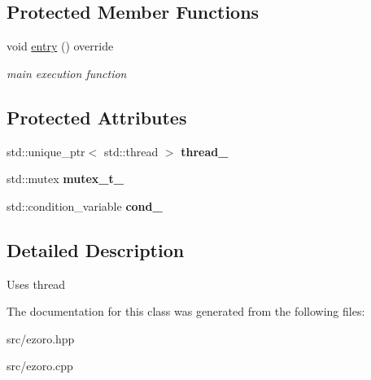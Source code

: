 \subsection*{Protected Member Functions}
\begin{DoxyCompactItemize}
\item 
\hypertarget{classcoco_1_1_parallel_activity_a320a783acbe011c53fed23747336e713}{void \hyperlink{classcoco_1_1_parallel_activity_a320a783acbe011c53fed23747336e713}{entry} () override}\label{classcoco_1_1_parallel_activity_a320a783acbe011c53fed23747336e713}

\begin{DoxyCompactList}\small\item\em main execution function \end{DoxyCompactList}\end{DoxyCompactItemize}
\subsection*{Protected Attributes}
\begin{DoxyCompactItemize}
\item 
\hypertarget{classcoco_1_1_parallel_activity_ae874a1d7b5a96573d823f559fb536952}{std\-::unique\-\_\-ptr$<$ std\-::thread $>$ {\bfseries thread\-\_\-}}\label{classcoco_1_1_parallel_activity_ae874a1d7b5a96573d823f559fb536952}

\item 
\hypertarget{classcoco_1_1_parallel_activity_a287ffe32ef172b36bf2d409aace9d521}{std\-::mutex {\bfseries mutex\-\_\-t\-\_\-}}\label{classcoco_1_1_parallel_activity_a287ffe32ef172b36bf2d409aace9d521}

\item 
\hypertarget{classcoco_1_1_parallel_activity_a1dcd65a0e7e115c3deebdebd2e8646a1}{std\-::condition\-\_\-variable {\bfseries cond\-\_\-}}\label{classcoco_1_1_parallel_activity_a1dcd65a0e7e115c3deebdebd2e8646a1}

\end{DoxyCompactItemize}


\subsection{Detailed Description}
Uses thread 

The documentation for this class was generated from the following files\-:\begin{DoxyCompactItemize}
\item 
src/ezoro.\-hpp\item 
src/ezoro.\-cpp\end{DoxyCompactItemize}
